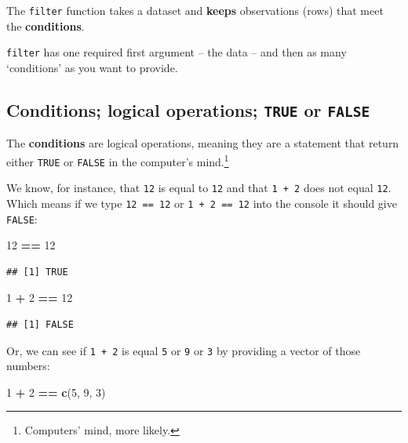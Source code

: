 \documentclass[]{book}
\newenvironment{Shaded}{\begin{snugshade}}{\end{snugshade}}
\newcommand{\DecValTok}[1]{\textcolor[rgb]{0.00,0.00,0.81}{#1}}
\newcommand{\KeywordTok}[1]{\textcolor[rgb]{0.13,0.29,0.53}{\textbf{#1}}}
\newcommand{\NormalTok}[1]{#1}
\newcommand{\OperatorTok}[1]{\textcolor[rgb]{0.81,0.36,0.00}{\textbf{#1}}}
\newcommand{\StringTok}[1]{\textcolor[rgb]{0.31,0.60,0.02}{#1}}
\begin{document}
The \texttt{filter} function takes a dataset and \textbf{keeps} observations (rows) that meet the \textbf{conditions}.

\texttt{filter} has one required first argument -- the data -- and then as many `conditions' as you want to provide.

\hypertarget{conditions-logical-operations-true-or-false}{%
\subsection{\texorpdfstring{Conditions; logical operations; \texttt{TRUE} or \texttt{FALSE}}{Conditions; logical operations; TRUE or FALSE}}\label{conditions-logical-operations-true-or-false}}

The \textbf{conditions} are logical operations, meaning they are a statement that return either \texttt{TRUE} or \texttt{FALSE} in the computer's mind.\footnote{Computers' mind, more likely.}

We know, for instance, that \texttt{12} is equal to \texttt{12} and that \texttt{1\ +\ 2} does not equal \texttt{12}. Which means if we type \texttt{12\ ==\ 12} or \texttt{1\ +\ 2\ ==\ 12} into the console it should give \texttt{FALSE}:

\begin{Shaded}
\begin{Highlighting}[]
\DecValTok{12} \OperatorTok{==}\StringTok{ }\DecValTok{12}
\end{Highlighting}
\end{Shaded}

\begin{verbatim}
## [1] TRUE
\end{verbatim}

\begin{Shaded}
\begin{Highlighting}[]
\DecValTok{1} \OperatorTok{+}\StringTok{ }\DecValTok{2} \OperatorTok{==}\StringTok{ }\DecValTok{12}
\end{Highlighting}
\end{Shaded}

\begin{verbatim}
## [1] FALSE
\end{verbatim}

Or, we can see if \texttt{1\ +\ 2} is equal \texttt{5} or \texttt{9} or \texttt{3} by providing a vector of those numbers:

\begin{Shaded}
\begin{Highlighting}[]
\DecValTok{1} \OperatorTok{+}\StringTok{ }\DecValTok{2} \OperatorTok{==}\StringTok{ }\KeywordTok{c}\NormalTok{(}\DecValTok{5}\NormalTok{, }\DecValTok{9}\NormalTok{, }\DecValTok{3}\NormalTok{)}
\end{Highlighting}
\end{Shaded}
\end{document}
